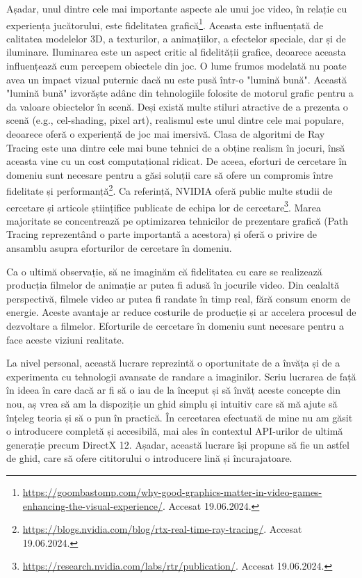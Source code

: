 \documentclass[12pt,a4paper]{report}
\numberwithin{equation}{section} %
\begin{document}
Așadar, unul dintre cele mai importante aspecte ale unui joc video, în relație cu
experiența jucătorului, este fidelitatea grafică\footnote{\url{https://goombastomp.com/why-good-graphics-matter-in-video-games-enhancing-the-visual-experience/}. Accesat 19.06.2024.}. Aceasta este influențată de
calitatea modelelor 3D, a texturilor, a animațiilor, a efectelor speciale, dar
și de iluminare. Iluminarea este un aspect critic al fidelității grafice, deoarece
aceasta influențează cum percepem obiectele din joc. O lume frumos modelată nu
poate avea un impact vizual puternic dacă nu este pusă într-o "lumină bună".
Această "lumină bună" izvorăște adânc din tehnologiile folosite de motorul grafic
pentru a da valoare obiectelor în scenă. Deși există multe stiluri atractive de
a prezenta o scenă (e.g., cel-shading, pixel art), realismul este unul dintre cele
mai populare, deoarece oferă o experiență de joc mai imersivă. Clasa de algoritmi
de Ray Tracing este una dintre cele mai bune tehnici de a obține realism în jocuri,
însă aceasta vine cu un cost computațional ridicat. De aceea, eforturi de cercetare
în domeniu sunt necesare pentru a găsi soluții care să ofere un compromis între
fidelitate și performanță\footnote{\url{https://blogs.nvidia.com/blog/rtx-real-time-ray-tracing/}. Accesat 19.06.2024.}.
Ca referință, NVIDIA oferă public multe studii de cercetare și articole științifice
publicate de echipa lor de cercetare\footnote{\url{https://research.nvidia.com/labs/rtr/publication/}. Accesat 19.06.2024.}.
Marea majoritate se concentrează pe optimizarea tehnicilor de prezentare grafică
(Path Tracing reprezentând o parte importantă a acestora) și oferă o privire de
ansamblu asupra eforturilor de cercetare în domeniu.

Ca o ultimă observație, să ne imaginăm că fidelitatea cu care se realizează
producția filmelor de animație ar putea fi adusă în jocurile video. Din cealaltă
perspectivă, filmele video ar putea fi randate în timp real, fără consum enorm
de energie. Aceste avantaje ar reduce costurile de producție și ar accelera
procesul de dezvoltare a filmelor. Eforturile de cercetare în domeniu sunt
necesare pentru a face aceste viziuni realitate.

La nivel personal, această lucrare reprezintă o oportunitate de a învăța și
de a experimenta cu tehnologii avansate de randare a imaginilor. Scriu lucrarea
de față în ideea în care dacă ar fi să o iau de la început și să învăț aceste concepte
din nou, aș vrea să am la dispoziție un ghid simplu și intuitiv care să mă
ajute să înțeleg teoria și să o pun în practică. În cercetarea efectuată de mine
nu am găsit o introducere completă și accesibilă, mai ales în contextul API-urilor
de ultimă generație precum DirectX 12. Așadar, această lucrare își propune să
fie un astfel de ghid, care să ofere cititorului o introducere lină și încurajatoare.
\end{document}
